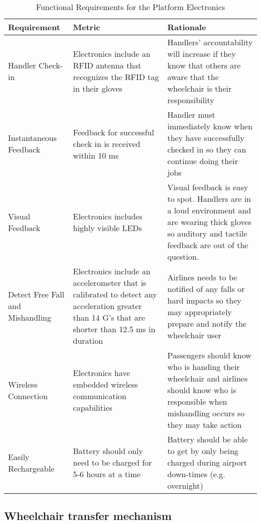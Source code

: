 \begin{table}
\begin{tabular} {| p{4cm} | p{5cm} | p{5cm} |}
\hline
\textbf{Requirement} & \textbf{Metric} & \textbf{Rationale} \\ \hline
Handler Check-in & Electronics include an RFID antenna that recognizes the RFID tag in their gloves & Handlers' accountability will increase if they know that others are aware that the wheelchair is their responsibility \\ \hline
Instantaneous Feedback & 	Feedback for successful check in is received within 10 ms & Handler must immediately know when they have successfully checked in so they can continue doing their jobs\\ \hline
Visual Feedback & Electronics includes highly visible LEDs & Visual feedback is easy to spot. Handlers are in a loud environment and are wearing thick gloves so auditory and tactile feedback are out of the question.\  \\ \hline
Detect Free Fall and Mishandling & Electronics include an accelerometer that is calibrated to detect any acceleration greater than 14 G’s that are shorter than 12.5 ms in duration & Airlines needs to be notified of any falls or hard impacts so they may appropriately prepare and notify the wheelchair user \\ \hline
Wireless Connection & Electronics have embedded wireless communication capabilities & Passengers should know who is handing their wheelchair and airlines should know who is responsible when mishandling occurs so they may take action \\ \hline
Easily Rechargeable & Battery should only need to be charged for 5-6 hours at a time & Battery should be able to get by only being charged during airport down-times (e.g. overnight) \\ \hline

\end{tabular} 
\caption{Functional Requirements for the Platform Electronics}
\label{tab:functional_requirements_electronics}
\end{table}

\clearpage
\newpage











\subsection*{Wheelchair transfer mechanism}

